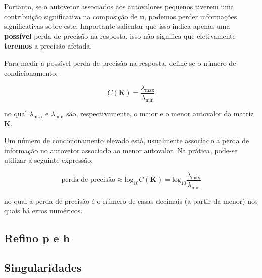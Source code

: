             Portanto, se o autovetor associados aos autovalores pequenos tiverem uma contribuição significativa na composição de $\bm{u}$, podemos perder informações significativas sobre este. Importante salientar que isso indica apenas uma \textbf{possível} perda de precisão na resposta, isso não significa que efetivamente \textbf{teremos} a precisão afetada.

            Para medir a possível perda de precisão na resposta, define-se o número de condicionamento:

            \begin{equation}
                C(\bm{K}) = \frac{\lambda_\text{max}}{\lambda_\text{min}}
            \end{equation}

            \noindent no qual $\lambda_\text{max}$ e $\lambda_\text{min}$ são, respectivamente, o maior e o menor autovalor da matriz $\bm{K}$.

            Um número de condicionamento elevado está, usualmente associado a perda de informação no autovetor associado ao menor autovalor. Na prática, pode-se utilizar a seguinte expressão:

            \begin{equation}
                \text{perda de precisão} \approx \text{log}_{10} C(\bm{K}) = \text{log}_{10} \frac{\lambda_\text{max}}{\lambda_\text{min}}
            \end{equation}

            \noindent no qual a perda de precisão é o número de casas decimais (a partir da menor) nos quais há erros numéricos.

    \subsection{Refino p e h}

    \subsection{Singularidades}
